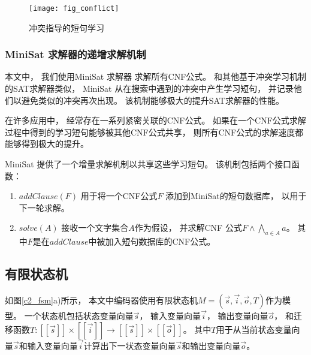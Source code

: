 \begin{figure}[t] %
  \centering
  \texttt{[image: fig\_conflict]}
  \caption{冲突指导的短句学习}
  \label{confict}
\end{figure}

\subsubsection{MiniSat 求解器的递增求解机制}\label{subsec_incsat}

本文中，
我们使用MiniSat 求解器 求解所有CNF公式。
和其他基于冲突学习机制的SAT求解器类似，
MiniSat 从在搜索中遇到的冲突中产生学习短句，
并记录他们以避免类似的冲突再次出现。
该机制能够极大的提升SAT求解器的性能。

在许多应用中，
经常存在一系列紧密关联的CNF公式。
如果在一个CNF公式求解过程中得到的学习短句能够被其他CNF公式共享，
则所有CNF公式的求解速度都能够得到极大的提升。

MiniSat 提供了一个增量求解机制以共享这些学习短句。
该机制包括两个接口函数：
\begin{enumerate}
\item
$addClause(F)$ 用于将一个CNF公式$F$ 添加到MiniSat的短句数据库，
以用于下一轮求解。
\item
$solve(A)$ 接收一个文字集合$A$作为假设，
并求解CNF 公式$F\wedge \bigwedge_{a\in A} a$。
其中$F$是在$addClause$中被加入短句数据库的CNF公式。
\end{enumerate}



\subsection{有限状态机}\label{subsec_fsm}

如图\ref{c2_fsm}a)所示，
本文中编码器使用有限状态机$M=(\vec{s},\vec{i},\vec{o},T)$作为模型。
一个状态机包括状态变量向量$\vec{s}$，
输入变量向量$\vec{i}$，
输出变量向量$\vec{o}$，
和迁移函数$T: [\![\vec{s}]\!]\times [\![\vec{i}]\!]\to [\![\vec{s}]\!]\times [\![\vec{o}]\!]$。
其中$T$用于从当前状态变量向量$\vec{s}$和输入变量向量$\vec{i}$计算出下一状态变量向量$\vec{s}$和输出变量向量$\vec{o}$。


